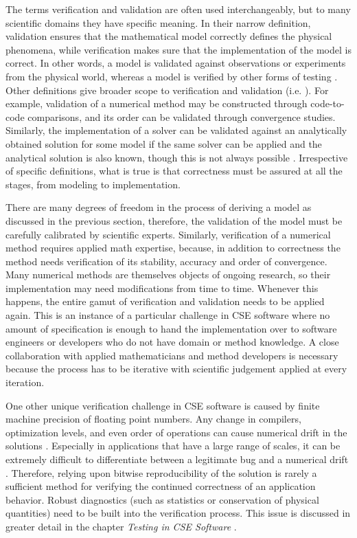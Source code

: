 The terms verification and validation are often used interchangeably,
but to many scientific domains they have specific meaning.   
In their narrow definition, validation ensures that the mathematical
model correctly defines the physical phenomena, while verification
makes sure that the implementation of the model is correct. In other
words, a model is validated against observations or experiments from
the physical world, whereas a model is verified by other forms of
testing \cite{oberkampf2002verification}.   Other definitions give
broader scope to  verification and validation (i.e. \cite{sargent1998verification}). For
example, validation of a numerical method may be constructed through
code-to-code comparisons, and its order can be validated through
convergence studies. Similarly, the implementation of a solver can be
validated against an analytically obtained solution for some model if
the same solver can be applied and the analytical solution is also
known, though this is not always possible
\cite{oberkampf2010verification}.  Irrespective of  specific
definitions, what is true is that   correctness must be assured at all
the stages, from modeling to implementation.     

There are many degrees of freedom in the process of deriving a
model as discussed in the previous section, therefore, the validation of the
model must be carefully calibrated by scientific experts. Similarly,
verification of a numerical method requires applied math expertise,
because, in addition to correctness the method needs verification of its stability, accuracy and
order of convergence. Many numerical methods 
are themselves objects of ongoing research, so their
implementation may need modifications from time to time. Whenever
this happens, the entire gamut of verification and validation needs to
be applied again. This is an instance of a particular challenge in 
CSE software where no amount of specification is enough to hand the
implementation over to software engineers or developers who do not
have domain or method knowledge. A close collaboration with applied
mathematicians and method developers is necessary because the process
has to be iterative with scientific judgement applied at every
iteration.  

One other unique verification challenge in CSE software is caused by 
finite machine precision of floating point numbers. Any change in
compilers, optimization levels, and even order of operations can cause
numerical drift in the solutions
\cite{monniaux2008pitfalls}. Especially in applications that have a
large range of scales, it can be extremely difficult to differentiate
between a legitimate bug and a numerical drift \cite{Dubey2015}. Therefore, relying
upon bitwise reproducibility of the solution is rarely a sufficient
method for verifying the continued correctness of an application
behavior. Robust diagnostics (such as statistics or conservation of
physical quantities) need to be built into the verification process.
This issue is discussed in greater detail in the chapter {\em Testing
  in CSE Software} .  

